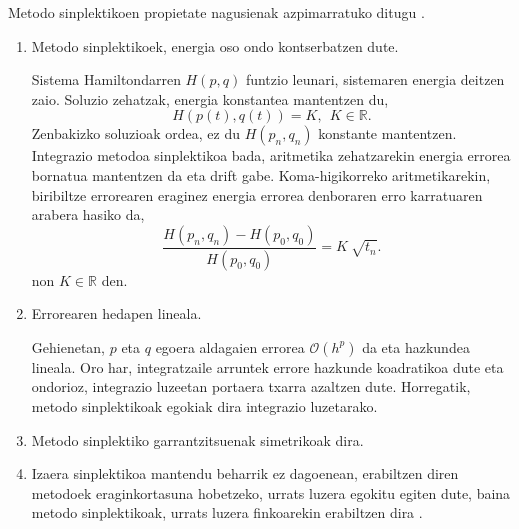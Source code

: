 Metodo sinplektikoen propietate nagusienak azpimarratuko ditugu \cite{Hairer2006,JMSanz-Serna1994}.
\begin{enumerate}

\item Metodo sinplektikoek, energia oso ondo kontserbatzen dute.

Sistema Hamiltondarren $H(p,q)$ funtzio leunari, sistemaren energia deitzen zaio. Soluzio zehatzak, energia konstantea mantentzen du,
\begin{equation*}
H(p(t),q(t))=K, \ \ K \in \mathbb{R}.
\end{equation*}
Zenbakizko soluzioak ordea, ez du $H(p_n,q_n)$  konstante mantentzen. Integrazio metodoa sinplektikoa bada, aritmetika zehatzarekin energia errorea bornatua mantentzen da eta drift gabe. Koma-higikorreko aritmetikarekin, biribiltze errorearen eraginez energia errorea denboraren erro karratuaren arabera hasiko da,
\begin{equation*}
\frac{H(p_n,q_n)-H(p_0,q_0)}{H(p_0,q_0)}=K \ \sqrt{t_n}.
\end{equation*}
non $K\in \mathbb{R}$ den.

\item Errorearen hedapen lineala.

Gehienetan, $p$ eta $q$ egoera aldagaien errorea $\mathcal{O}(h^p)$ da eta hazkundea lineala. Oro har, integratzaile arruntek errore hazkunde koadratikoa dute eta ondorioz, integrazio luzeetan portaera txarra azaltzen dute. Horregatik, metodo sinplektikoak egokiak dira integrazio luzetarako.

\item Metodo sinplektiko garrantzitsuenak simetrikoak dira.

\item

Izaera sinplektikoa mantendu beharrik ez dagoenean, erabiltzen diren metodoek eraginkortasuna hobetzeko, urrats luzera egokitu egiten dute, baina metodo sinplektikoak, urrats luzera finkoarekin erabiltzen dira \cite{JMSanz-Serna1994}.

\end{enumerate} 

